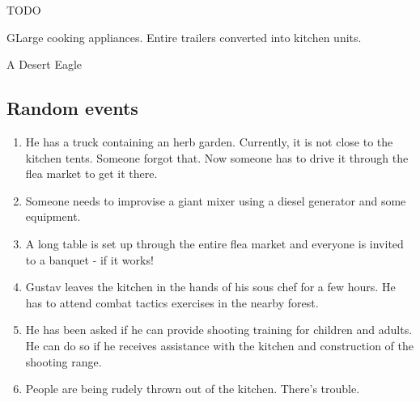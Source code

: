 \begin{npcBox}[title=Gustav Müller]
    \begin{stressSection}
    \end{stressSection}
    \begin{tabularx}{\textwidth}{ XX }
    \end{tabularx}

    \begin{consequences}
    \item {}
    \item {}
    \item {}
    \end{consequences}

    \begin{npcDescription}
    TODO
    \end{npcDescription}


    \begin{equipment}
    \item GLarge cooking appliances. Entire trailers converted into kitchen units.
    \item A Desert Eagle
    \end{equipment}
\end{npcBox}


\subsection{Random events}

\begin{enumerate}
\item He has a truck containing an herb garden. Currently, it is not close to the kitchen tents. Someone forgot that. Now someone has to drive it through the flea market to get it there.
\item Someone needs to improvise a giant mixer using a diesel generator and some equipment.
\item A long table is set up through the entire flea market and everyone is invited to a banquet - if it works!
\item Gustav leaves the kitchen in the hands of his sous chef for a few hours. He has to attend combat tactics exercises in the nearby forest.
\item He has been asked if he can provide shooting training for children and adults. He can do so if he receives assistance with the kitchen and construction of the shooting range.
\item People are being rudely thrown out of the kitchen. There's trouble.
\end{enumerate}

